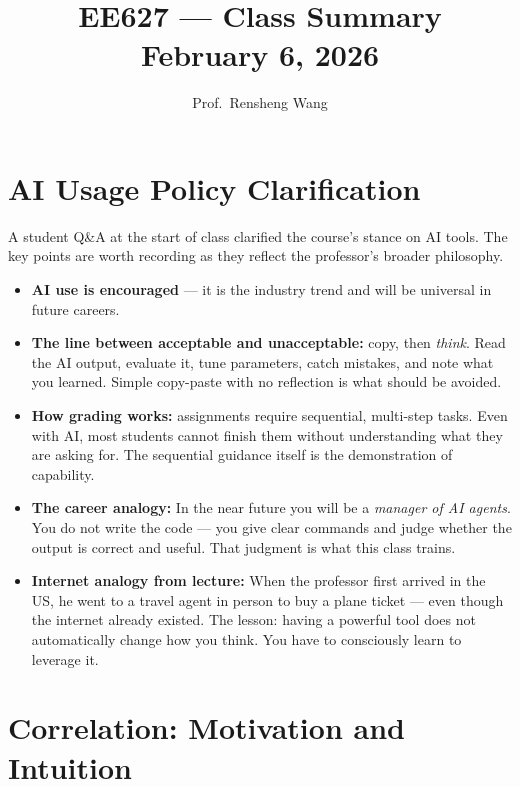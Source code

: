 \documentclass[11pt]{article}
\title{\textbf{EE627 --- Class Summary}\\[0.4em]
       \large February 6, 2026}
\author{Prof.\ Rensheng Wang}
\date{}
\begin{document}
\maketitle
\tableofcontents
\newpage

\section{AI Usage Policy Clarification}

A student Q\&A at the start of class clarified the course's stance on AI tools.
The key points are worth recording as they reflect the professor's broader philosophy.

\begin{itemize}
    \item \textbf{AI use is encouraged} --- it is the industry trend and will be
      universal in future careers.
    \item \textbf{The line between acceptable and unacceptable:} copy, then
      \emph{think}. Read the AI output, evaluate it, tune parameters, catch
      mistakes, and note what you learned. Simple copy-paste with no reflection
      is what should be avoided.
    \item \textbf{How grading works:} assignments require sequential, multi-step
      tasks. Even with AI, most students cannot finish them without understanding
      what they are asking for. The sequential guidance itself is the demonstration
      of capability.
    \item \textbf{The career analogy:} In the near future you will be a
      \emph{manager of AI agents}. You do not write the code --- you give clear
      commands and judge whether the output is correct and useful. That judgment
      is what this class trains.
    \item \textbf{Internet analogy from lecture:} When the professor first arrived
      in the US, he went to a travel agent in person to buy a plane ticket --- even
      though the internet already existed. The lesson: having a powerful tool does
      not automatically change how you think. You have to consciously learn to
      leverage it.
\end{itemize}


\section{Correlation: Motivation and Intuition}
\end{document}
